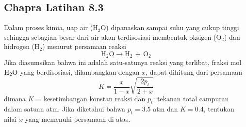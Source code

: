 \subsection{Chapra Latihan 8.3}
Dalam proses kimia, uap air ($\mathrm{H}_{\mathrm{2}}\mathrm{O}$) dipanaskan sampai
suhu yang cukup tinggi sehingga sebagian besar dari air akan terdisosiasi membentuk oksigen
($\mathrm{O}_{2}$) dan hidrogen ($\mathrm{H}_{2}$) menurut persamaan reaksi
\begin{equation*}
\mathrm{H}_2\mathrm{O} \rightarrow \mathrm{H}_{2}\,+\,\mathrm{O}_{2}
\end{equation*}
Jika diasumsikan bahwa ini adalah satu-satunya reaksi yang terlibat, fraksi
mol $\ce{H2O}$ yang berdisosiasi, dilambangkan dengan $x$, dapat dihitung dari persamaan
\begin{equation*}
K = \frac{x}{1-x}\sqrt{\frac{2p_t}{2+x}}
\end{equation*}
dimana $K$ = kesetimbangan konstan reaksi dan $p_t$: tekanan total campuran
dalam satuan atm.
Jika diketahui bahwa $p_t = 3.5$ atm dan $K = 0.4$, tentukan nilai $x$ yang memenuhi
persamaan di atas.